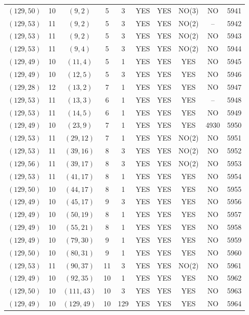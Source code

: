 \begin{longtable}{|c|c|c|c|c|c|c|c|c|c|}
$(129, 50)$ & 10 & $(9, 2)$ & 5 & 3 & YES & YES & NO(3) & NO & 5941\\
$(129, 53)$ & 11 & $(9, 2)$ & 5 & 3 & YES & YES & NO(2) & -- & 5942\\
$(129, 53)$ & 11 & $(9, 2)$ & 5 & 3 & YES & YES & NO(2) & NO & 5943\\
$(129, 53)$ & 11 & $(9, 4)$ & 5 & 3 & YES & YES & NO(2) & NO & 5944\\
$(129, 49)$ & 10 & $(11, 4)$ & 5 & 1 & YES & YES & YES & NO & 5945\\
$(129, 49)$ & 10 & $(12, 5)$ & 5 & 3 & YES & YES & YES & NO & 5946\\
$(129, 28)$ & 12 & $(13, 2)$ & 7 & 1 & YES & YES & YES & NO & 5947\\
$(129, 53)$ & 11 & $(13, 3)$ & 6 & 1 & YES & YES & YES & -- & 5948\\
$(129, 53)$ & 11 & $(14, 5)$ & 6 & 1 & YES & YES & YES & NO & 5949\\
$(129, 49)$ & 10 & $(23, 9)$ & 7 & 1 & YES & YES & YES & 4930 & 5950\\
$(129, 53)$ & 11 & $(29, 12)$ & 7 & 1 & YES & YES & NO(2) & NO & 5951\\
$(129, 53)$ & 11 & $(39, 16)$ & 8 & 3 & YES & YES & NO(2) & NO & 5952\\
$(129, 56)$ & 11 & $(39, 17)$ & 8 & 3 & YES & YES & NO(2) & NO & 5953\\
$(129, 53)$ & 11 & $(41, 17)$ & 8 & 1 & YES & YES & YES & NO & 5954\\
$(129, 50)$ & 10 & $(44, 17)$ & 8 & 1 & YES & YES & YES & NO & 5955\\
$(129, 49)$ & 10 & $(45, 17)$ & 9 & 3 & YES & YES & YES & NO & 5956\\
$(129, 49)$ & 10 & $(50, 19)$ & 8 & 1 & YES & YES & YES & NO & 5957\\
$(129, 49)$ & 10 & $(55, 21)$ & 8 & 1 & YES & YES & YES & NO & 5958\\
$(129, 49)$ & 10 & $(79, 30)$ & 9 & 1 & YES & YES & YES & NO & 5959\\
$(129, 50)$ & 10 & $(80, 31)$ & 9 & 1 & YES & YES & YES & NO & 5960\\
$(129, 53)$ & 11 & $(90, 37)$ & 11 & 3 & YES & YES & NO(2) & NO & 5961\\
$(129, 49)$ & 10 & $(92, 35)$ & 10 & 1 & YES & YES & YES & NO & 5962\\
$(129, 50)$ & 10 & $(111, 43)$ & 10 & 3 & YES & YES & YES & NO & 5963\\
$(129, 49)$ & 10 & $(129, 49)$ & 10 & 129 & YES & YES & YES & NO & 5964\\

\end{longtable}
